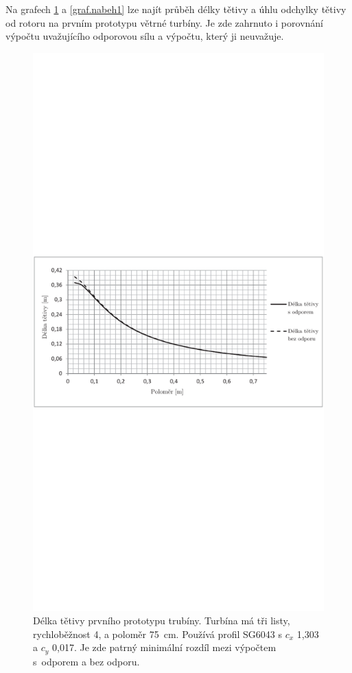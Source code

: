 	Na grafech \ref{graf.delka1} a \ref{graf.nabeh1} lze najít průběh délky tětivy a úhlu odchylky tětivy od rotoru na prvním prototypu větrné turbíny. Je zde zahrnuto i porovnání výpočtu uvažujícího odporovou sílu a výpočtu, který ji neuvažuje.
	
	\begin{figure}[H]
			\centering
				\includegraphics[]{obrazky/grafy/delkap}
			\caption{Délka tětivy prvního prototypu trubíny. Turbína má tři listy, rychloběžnost 4, a poloměr 75~cm. Používá profil SG6043 s $c_x$ 1,303 a $c_y$ 0,017. Je zde patrný minimální rozdíl mezi výpočtem s~odporem a bez odporu.}
			\label{graf.delka1}
		  \end{figure}
		  
